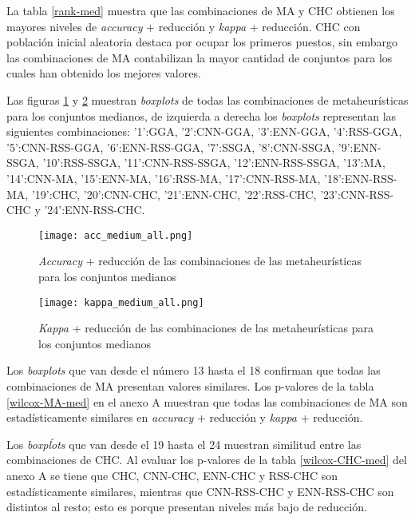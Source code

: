La tabla \ref{rank-med} muestra que las combinaciones de MA y CHC obtienen los mayores niveles de \emph{accuracy} + reducción y \emph{kappa} + reducción. CHC con población inicial aleatoria destaca por ocupar los primeros puestos, sin embargo las combinaciones de MA contabilizan la mayor cantidad de conjuntos para los cuales han obtenido los mejores valores.

\newpage

Las figuras \ref{medium-accu-all} y \ref{medium-kap-all} muestran \emph{boxplots} de todas las combinaciones de metaheurísticas para los conjuntos medianos, de izquierda a derecha los \emph{boxplots} representan las siguientes combinaciones: '1':GGA, '2':CNN-GGA, '3':ENN-GGA, '4':RSS-GGA, '5':CNN-RSS-GGA, '6':ENN-RSS-GGA, '7':SSGA, '8':CNN-SSGA, '9':ENN-SSGA, '10':RSS-SSGA, '11':CNN-RSS-SSGA, '12':ENN-RSS-SSGA, '13':MA, '14':CNN-MA, '15':ENN-MA, '16':RSS-MA, '17':CNN-RSS-MA, '18':ENN-RSS-MA, '19':CHC, '20':CNN-CHC, '21':ENN-CHC, '22':RSS-CHC, '23':CNN-RSS-CHC y '24':ENN-RSS-CHC.

\begin{figure}[h!]

	\centering
	\texttt{[image: acc\_medium\_all.png]}

\caption{\emph{Accuracy} + reducción de las combinaciones de las metaheurísticas para los conjuntos medianos}
\label{medium-accu-all}
\end{figure}


\begin{figure}[h!]

	\centering
	\texttt{[image: kappa\_medium\_all.png]}

\caption{\emph{Kappa} + reducción de las combinaciones de las metaheurísticas para los conjuntos medianos}
\label{medium-kap-all}
\end{figure}

Los \emph{boxplots} que van desde el número 13 hasta el 18 confirman que todas las combinaciones de MA presentan valores similares. Los p-valores de la tabla \ref{wilcox-MA-med} en el anexo A muestran que todas las combinaciones de MA son estadísticamente similares en \emph{accuracy} + reducción y \emph{kappa} + reducción.

Los \emph{boxpĺots} que van desde el 19 hasta el 24 muestran similitud entre las combinaciones de CHC. Al evaluar los p-valores de la tabla \ref{wilcox-CHC-med} del anexo A se tiene que CHC, CNN-CHC, ENN-CHC y RSS-CHC son estadísticamente similares, mientras que CNN-RSS-CHC y ENN-RSS-CHC son distintos al resto; esto es porque presentan niveles más bajo de reducción.

